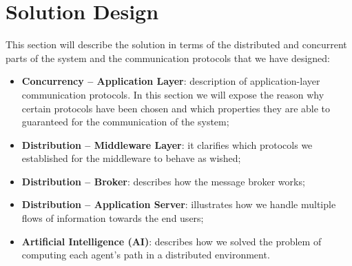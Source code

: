 \section{Solution Design}

This section will describe the solution in terms of the distributed and
concurrent parts of the system and the communication protocols that we have
designed:

\begin{itemize}
\item \textbf{Concurrency -- Application Layer}:
  description of application-layer communication protocols. In this section we
  will expose the reason why certain protocols have been chosen and which
  properties they are able to guaranteed for the communication of the system;
\item \textbf{Distribution -- Middleware Layer}:
  it clarifies which protocols
  we established for the middleware to behave as wished;
\item \textbf{Distribution -- Broker}:
  describes how the message broker works;
\item \textbf{Distribution -- Application Server}:
  illustrates how we handle multiple flows of information towards the end
  users;
\item \textbf{Artificial Intelligence (AI)}:
  describes how we solved the problem of computing each agent's path
  in a distributed environment.
\end{itemize}










